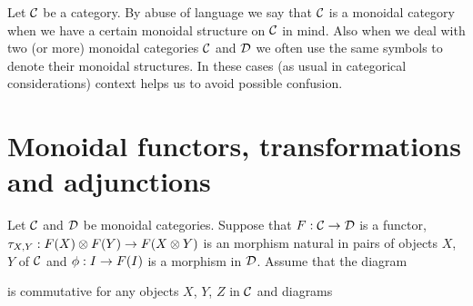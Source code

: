 \noindent
Let ${\mathcal C}$ be a category. By abuse of language we say that ${\mathcal C}$ is a monoidal category when we have a certain monoidal structure on ${\mathcal C}$ in mind. Also when we deal with two (or more) monoidal categories ${\mathcal C}$ and ${\mathcal D}$ we often use the same symbols to denote their monoidal structures. In these cases (as usual in categorical considerations) context helps us to avoid possible confusion.

\section{Monoidal functors, transformations and adjunctions}

\begin{definition}
Let ${\mathcal C}$ and ${\mathcal D}$ be monoidal categories. Suppose that $F:{\mathcal C}\rightarrow {\mathcal D}$ is a functor, $\tau_{X,Y}:F(X)\otimes F(Y)\rightarrow F(X\otimes Y)$ is an morphism natural in pairs of objects $X$, $Y$ of ${\mathcal C}$ and $\phi:I\rightarrow F(I)$ is a morphism in ${\mathcal D}$. Assume that the diagram
\begin{center}
\end{center}
is commutative for any objects $X$, $Y$, $Z$ in ${\mathcal C}$ and diagrams
\begin{center}
\end{center}
\end{definition}
